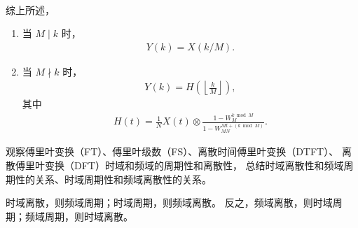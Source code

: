 \begin{solution}
\begin{enumerate}[label=(\arabic*)]
\begin{enumerate}
\begin{align*}
                    \end{align*}
            \end{enumerate}
            综上所述，
            \begin{enumerate}
                \item 当 $M \mid k$ 时，
                    \begin{align*}
                        Y(k) = X(k / M).
                    \end{align*}
                \item 当 $M \nmid k$ 时，
                    \begin{align*}
                        Y(k) = H\left(\left\lfloor\frac{k}{M}\right\rfloor\right),
                    \end{align*}
                    其中
                    \begin{align*}
                        H(t) = \frac{1}{N}X(t) \otimes \frac{1 - W_M^{k \bmod M}}{1 - W_{MN}^{Mt + (k\bmod M)}}.
                    \end{align*}
            \end{enumerate}
    \end{enumerate}
\end{solution}

\begin{homework}
    观察傅里叶变换（FT）、傅里叶级数（FS）、离散时间傅里叶变换（DTFT）、
    离散傅里叶变换（DFT）时域和频域的周期性和离散性，
    总结时域离散性和频域周期性的关系、时域周期性和频域离散性的关系。
\end{homework}

\begin{solution}
    时域离散，则频域周期；时域周期，则频域离散。
    反之，频域离散，则时域周期；频域周期，则时域离散。
\end{solution}
